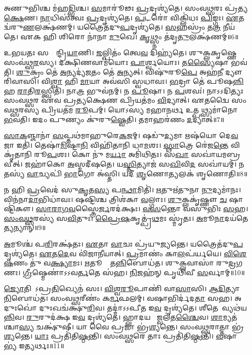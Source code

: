 𑌅𑌣𑍁𑌭𑌿𑌶𑍍𑌚 𑌮॑𑌹\ul{𑌦𑍍𑌭𑌿}𑌶𑍍𑌚। \ul{𑌸}𑌮𑌾𑌰𑍂॑𑌢𑌃 \ul{𑌪𑍍𑌰}𑌦𑍃𑌶𑍍𑌯॑𑌤𑍇। 
𑌸𑌂𑌵𑌥𑍍𑌸𑌰𑌃 𑌪𑍍𑌰॑𑌤𑍍𑌯\ul{𑌕𑍍𑌷𑍇}𑌣। \ul{𑌨𑌾}𑌧𑌿𑌸॑𑌤𑍍𑌵𑌃 \ul{𑌪𑍍𑌰}𑌦𑍃𑌶𑍍𑌯॑𑌤𑍇। 
\ul{𑌪}𑌟𑌰𑍋॑ 𑌵𑌿𑌕𑍍𑌲𑌿॑𑌧𑌃 \ul{𑌪𑌿}𑌙𑍍𑌗𑌃। \ul{𑌏}𑌤𑌦𑍍𑌵॑𑌰𑍁\ul{𑌣}𑌲𑌕𑍍𑌷॑𑌣𑌮𑍍‌। 
𑌯𑌤𑍍𑌰𑍈𑌤॑𑌦𑍁\ul{𑌪}𑌦𑍃𑌶𑍍𑌯॑𑌤𑍇। \ul{𑌸}𑌹𑌸𑍍𑌰𑌂॑ 𑌤\ul{𑌤𑍍𑌰} 𑌨𑍀𑌯॑𑌤𑍇। 
𑌏𑌕 𑌹𑌿 𑌶𑌿𑌰𑍋 𑌨𑌾॑𑌨𑌾 \ul{𑌮𑍁}𑌖𑍇। \ul{𑌕𑍃}𑌥𑍍𑌸𑍍𑌨𑌂 𑌤॑𑌦𑍃\ul{𑌤𑍁}𑌲𑌕𑍍𑌷॑𑌣𑌮𑍍‌॥6॥

𑌉𑌭𑌯𑌤𑌃 𑌸𑌪𑍍𑌤𑍇᳚𑌨𑍍𑌦𑍍𑌰𑌿\ul{𑌯𑌾}𑌣𑌿। \ul{𑌜}𑌲𑍍𑌪𑌿𑌤𑌂॑ 𑌤𑍍𑌵𑍇\ul{𑌵} 𑌦𑌿𑌹𑍍𑌯॑𑌤𑍇। 
𑌶𑍁𑌕𑍍𑌲𑌕𑍃𑌷𑍍𑌣𑍇 𑌸𑌂𑌵॑𑌥𑍍𑌸\ul{𑌰}𑌸𑍍𑌯। 𑌦𑌕𑍍𑌷𑌿𑌣𑌵𑌾𑌮॑𑌯𑍋𑌃 \ul{𑌪𑌾}𑌰𑍍𑌶𑍍𑌵𑌯𑍋𑌃। 
𑌤\ul{𑌸𑍍𑌯𑍈}𑌷𑌾 𑌭𑌵॑𑌤𑌿। \ul{𑌶𑍁}𑌕𑍍𑌰𑌂 𑌤𑍇॑ \ul{𑌅}𑌨𑍍𑌯𑌦𑍍𑌯॑\ul{𑌜}𑌤𑌂 𑌤𑍇॑ \ul{𑌅}𑌨𑍍𑌯𑌤𑍍‌। 
𑌵𑌿𑌷𑍁॑𑌰𑍂\ul{𑌪𑍇} 𑌅𑌹॑\ul{𑌨𑍀} 𑌦𑍍𑌯𑍗𑌰𑌿॑𑌵𑌾𑌸𑌿। 𑌵𑌿\ul{𑌶𑍍𑌵𑌾} 𑌹𑌿 \ul{𑌮𑌾}𑌯𑌾 𑌅𑌵॑𑌸𑌿 𑌸𑍍𑌵𑌧𑌾𑌵𑌃। 
\ul{𑌭}𑌦𑍍𑌰𑌾 𑌤𑍇॑ 𑌪𑍂𑌷\ul{𑌨𑍍𑌨𑌿}𑌹 \ul{𑌰𑌾}𑌤𑌿\ul{𑌰}𑌸𑍍𑌤𑍍𑌵𑌿𑌤𑌿॑। 𑌨𑌾\ul{𑌤𑍍𑌰} 𑌭𑍁𑌵॑𑌨𑌮𑍍‌। 𑌨 \ul{𑌪𑍂}𑌷𑌾। 
𑌨 \ul{𑌪}𑌶𑌵𑌃॑। 𑌨𑌾𑌽𑌽𑌦𑌿𑌤𑍍𑌯𑌃 𑌸𑌂𑌵𑌥𑍍𑌸𑌰 𑌏𑌵 𑌪𑍍𑌰𑌤𑍍𑌯𑌕𑍍𑌷𑍇𑌣 𑌪𑍍𑌰𑌿𑌯𑌤॑𑌮𑌂 \ul{𑌵𑌿}𑌦𑍍𑌯𑌾𑌤𑍍‌। 
𑌏𑌤𑌦𑍍𑌵𑍈 𑌸𑌂𑌵𑌥𑍍𑌸𑌰𑌸𑍍𑌯 𑌪𑍍𑌰𑌿𑌯𑌤॑𑌮 \ul{𑌰𑍂}𑌪𑌮𑍍‌। 𑌯𑍋𑌽𑌸𑍍𑌯 𑌮𑌹𑌾𑌨𑌰𑍍𑌥 𑌉𑌤𑍍𑌪𑌥𑍍𑌸𑍍𑌯𑌮𑌾॑𑌨𑍋 \ul{𑌭}𑌵𑌤𑌿। 
𑌇𑌦𑌂 𑌪𑍁𑌣𑍍𑌯𑌂 𑌕𑍁॑𑌰𑍁\ul{𑌷𑍍𑌵𑍇}𑌤𑌿। 𑌤𑌮𑌾𑌹𑌰॑𑌣𑌂 \ul{𑌦}𑌦𑍍𑌯𑌾𑌤𑍍‌॥7॥\anuvakamend


\ul{𑌸𑌾}\ul{𑌕}𑌞𑍍𑌜𑌾𑌨𑌾॑ \ul{𑌸}𑌪𑍍𑌤𑌥॑𑌮𑌾𑌹𑍁𑌰𑍇\ul{𑌕}𑌜𑌮𑍍‌। 𑌷𑌡𑍁॑\ul{𑌦𑍍𑌯}𑌮𑌾 𑌋𑌷॑𑌯𑍋 𑌦𑍇\ul{𑌵}𑌜𑌾 𑌇𑌤𑌿॑। 
𑌤𑍇𑌷𑌾॑\ul{𑌮𑌿}𑌷𑍍𑌟𑌾\ul{𑌨𑌿} 𑌵𑌿𑌹𑌿॑𑌤𑌾𑌨𑌿 𑌧𑌾\ul{𑌮}𑌶𑌃। \ul{𑌸𑍍𑌥𑌾}𑌤𑍍𑌰𑍇 𑌰𑍇॑𑌜\ul{𑌨𑍍𑌤𑍇} 𑌵𑌿𑌕𑍃॑𑌤𑌾𑌨𑌿 𑌰𑍂\ul{𑌪}𑌶𑌃। 
𑌕𑍋 𑌨𑍁॑ 𑌮\ul{𑌰𑍍𑌯𑌾} 𑌅𑌮𑌿॑𑌥𑌿𑌤𑌃। 𑌸\ul{𑌖𑌾} 𑌸𑌖𑌾॑𑌯𑌮𑌬𑍍𑌰𑌵𑍀𑌤𑍍‌। 
𑌜𑌹𑌾॑𑌕𑍋 \ul{𑌅}𑌸𑍍𑌮𑌦𑍀॑𑌷𑌤𑍇। 𑌯\ul{𑌸𑍍𑌤𑌿}𑌤𑍍𑌯𑌾𑌜॑ 𑌸\ul{𑌖𑌿}𑌵𑌿\ul{𑌦}\ul{} 𑌸𑌖𑌾॑𑌯𑌮𑍍‌। 
𑌨 𑌤𑌸𑍍𑌯॑ \ul{𑌵𑌾}𑌚𑍍𑌯𑌪𑌿॑ \ul{𑌭𑌾}𑌗𑍋 𑌅॑𑌸𑍍𑌤𑌿। 𑌯𑌦𑍀॑ \ul{𑌶𑍃}𑌣𑍋\ul{𑌤𑍍𑌯}𑌲𑌕॑ 𑌶𑍃𑌣𑍋𑌤𑌿॥8॥

𑌨 𑌹𑌿 \ul{𑌪𑍍𑌰}𑌵𑍇𑌦॑ 𑌸𑍁\ul{𑌕𑍃}𑌤\ul{𑌸𑍍𑌯} 𑌪\ul{𑌨𑍍𑌥𑌾}𑌮𑌿𑌤𑌿॑। \ul{𑌋}𑌤𑍁\ur{}𑌋॑𑌤𑍁𑌨𑌾 \ul{𑌨𑍁}𑌦𑍍𑌯𑌮𑌾॑𑌨𑌃। 
𑌵𑌿𑌨॑𑌨𑌾\ul{𑌦𑌾}𑌭𑌿𑌧𑌾॑𑌵𑌃। 𑌷𑌷𑍍𑌟𑌿𑌶𑍍𑌚 𑌤𑍍𑌰𑌿𑌶॑𑌕𑌾 \ul{𑌵}𑌲𑍍𑌗𑌾𑌃। 
\ul{𑌶𑍁}𑌕𑍍𑌲𑌕𑍃॑𑌷𑍍𑌣𑍗 \ul{𑌚} 𑌷𑌾𑌷𑍍𑌟𑌿॑𑌕𑍗। \ul{𑌸𑌾}\ul{𑌰𑌾}\ul{𑌗}\ul{𑌵}𑌸𑍍𑌤𑍍𑌰𑍈\ul{𑌰𑍍𑌜}𑌰𑌦॑𑌕𑍍𑌷𑌃। 
\ul{𑌵}\ul{𑌸}𑌨𑍍𑌤𑍋 𑌵𑌸𑍁॑𑌭𑌿𑌃 \ul{𑌸}𑌹। \ul{𑌸𑌂}\ul{𑌵}\ul{𑌥𑍍𑌸}𑌰𑌸𑍍𑌯॑ 𑌸\ul{𑌵𑌿}𑌤𑍁𑌃। 
\ul{𑌪𑍍𑌰𑍈}\ul{𑌷}𑌕𑍃𑌤𑍍𑌪𑍍𑌰॑\ul{𑌥}𑌮𑌃 𑌸𑍍𑌮𑍃॑𑌤𑌃। \ul{𑌅}𑌮𑍂\ul{𑌨𑌾}𑌦𑌯॑𑌤𑍇\ul{𑌤𑍍𑌯}𑌨𑍍𑌯𑌾𑌨𑍍‌॥9॥

\ul{𑌅}𑌮𑍂𑌶𑍍𑌚॑ 𑌪\ul{𑌰𑌿}𑌰𑌕𑍍𑌷॑𑌤𑌃। \ul{𑌏}𑌤𑌾 \ul{𑌵𑌾}𑌚𑌃 𑌪𑍍𑌰॑𑌯𑍁\ul{𑌜𑍍𑌯}𑌨𑍍𑌤𑍇। 
𑌯𑌤𑍍𑌰𑍈𑌤॑𑌦𑍁\ul{𑌪}𑌦𑍃𑌶𑍍𑌯॑𑌤𑍇। \ul{𑌏}𑌤\ul{𑌦𑍇}𑌵 𑌵𑌿॑𑌜𑌾\ul{𑌨𑍀}𑌯𑌾𑌤𑍍। 
\ul{𑌪𑍍𑌰}𑌮𑌾𑌣𑌂॑ 𑌕𑌾\ul{𑌲}𑌪॑𑌰𑍍𑌯𑌯𑍇। \ul{𑌵𑌿}\ul{𑌶𑍇}\ul{𑌷}𑌣𑌂 𑌤𑍁॑ 𑌵\ul{𑌕𑍍𑌷𑍍𑌯𑌾}𑌮𑌃। 
\ul{𑌋}𑌤𑍂𑌨𑌾𑌂᳚ 𑌤\ul{𑌨𑍍𑌨𑌿}𑌬𑍋𑌧॑𑌤। 𑌶𑍁𑌕𑍍𑌲𑌵𑌾𑌸𑌾॑ 𑌰𑍁\ul{𑌦𑍍𑌰}𑌗𑌣𑌃। 
\ul{𑌗𑍍𑌰𑍀}𑌷𑍍𑌮𑍇𑌣𑌾॑𑌽𑌽𑌵\ul{𑌰𑍍𑌤}𑌤𑍇 𑌸॑𑌹। \ul{𑌨𑌿}𑌜𑌹॑𑌨𑍍‌ 𑌪𑍃𑌥𑌿॑𑌵𑍀 \ul{𑌸}𑌰𑍍𑌵𑌾𑌮𑍍‌॥10॥

\ul{𑌜𑍍𑌯𑍋}𑌤𑌿𑌷𑌾᳚𑌽𑌪𑍍𑌰\ul{𑌤𑌿}𑌖𑍍𑌯𑍇𑌨॑ 𑌸𑌃। \ul{𑌵𑌿}\ul{𑌶𑍍𑌵}\ul{𑌰𑍂}𑌪𑌾𑌣𑌿॑ 𑌵𑌾\ul{𑌸𑌾}\ul{}𑌸𑌿। 
\ul{𑌆}\ul{𑌦𑌿}𑌤𑍍𑌯𑌾𑌨𑌾𑌂᳚ \ul{𑌨𑌿}𑌬𑍋𑌧॑𑌤। 𑌸𑌂𑌵𑌥𑍍𑌸𑌰𑍀𑌣𑌂॑ 𑌕\ul{𑌰𑍍𑌮}𑌫𑌲𑌮𑍍‌। 
𑌵\ur{}𑌷𑌾𑌭𑌿𑌰𑍍𑌦॑𑌦\ul{𑌤𑌾}\ul{} 𑌸𑌹। 𑌅𑌦𑍁𑌃𑌖𑍋॑ 𑌦𑍁𑌃𑌖𑌚॑𑌕𑍍𑌷𑍁\ul{𑌰𑌿}𑌵। 
𑌤𑌦𑍍𑌮𑌾॑𑌽𑌽𑌪𑍀𑌤 𑌇\ul{𑌵} 𑌦𑍃𑌶𑍍𑌯॑𑌤𑍇। 𑌶𑍀𑌤𑍇𑌨𑌾᳚𑌵𑍍𑌯𑌥॑𑌯\ul{𑌨𑍍𑌨𑌿}𑌵। 
\ul{𑌰𑍁}𑌰𑍁𑌦॑𑌕𑍍𑌷 𑌇\ul{𑌵} 𑌦𑍃𑌶𑍍𑌯॑𑌤𑍇। 𑌹𑍍𑌲𑌾𑌦𑌯𑌤𑍇᳚ 𑌜𑍍𑌵𑌲॑𑌤\ul{𑌶𑍍𑌚𑍈}𑌵। 
\ul{𑌶𑌾}𑌮𑍍𑌯𑌤॑𑌶𑍍𑌚𑌾\ul{𑌸𑍍𑌯} 𑌚𑌕𑍍𑌷𑍁॑𑌷𑍀। 𑌯𑌾 𑌵𑍈 𑌪𑍍𑌰𑌜𑌾 𑌭𑍍𑌰॑\ul{𑌶𑍍𑌯}𑌨𑍍𑌤𑍇। 
𑌸𑌂𑌵𑌥𑍍𑌸𑌰𑌾𑌤𑍍𑌤𑌾 𑌭𑍍𑌰॑\ul{𑌶𑍍𑌯}𑌨𑍍𑌤𑍇। \ul{𑌯𑌾𑌃} 𑌪𑍍𑌰𑌤𑌿॑𑌤𑌿\ul{𑌷𑍍𑌠}𑌨𑍍𑌤𑌿। 
𑌸𑌂𑌵𑌥𑍍𑌸𑌰𑍇 𑌤𑌾𑌃 𑌪𑍍𑌰𑌤𑌿॑𑌤𑌿\ul{𑌷𑍍𑌠}𑌨𑍍𑌤𑌿। \ul{𑌵}\ar{}𑌷𑌾𑌭𑍍𑌯॑ 𑌇\ul{𑌤𑍍𑌯}𑌰𑍍𑌥𑌃॥11॥\anuvakamend


